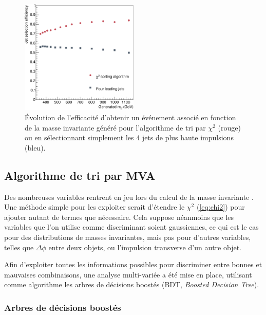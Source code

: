 \begin{figure}[tbp] \centering
    \includegraphics[width=0.50\textwidth]{chapitre6/figs/chi2/jet_selection_efficiency.pdf}
    \caption{Évolution de l'efficacité d'obtenir un événement associé en fonction de la masse invariante \ttbar généré pour l'algorithme de tri par $\chi^2$ (\textcolor{rouge_grandmere}{rouge}) ou en sélectionnant simplement les 4 jets de plus haute impulsions (\textcolor{bleu_gris}{bleu}).}
    \label{fig:chi2_vs_jets}
\end{figure}

\subsection{Algorithme de tri par MVA}

Des nombreuses variables rentrent en jeu lors du calcul de la masse invariante \ttbar. Une méthode simple pour les exploiter serait d'étendre le $\chi^2$ (\cref{eq:chi2}) pour ajouter autant de termes que nécessaire. Cela suppose néanmoins que les variables que l'on utilise comme discriminant soient gaussiennes, ce qui est le cas pour des distributions de masses invariantes, mais pas pour d'autres variables, telles que $\Delta \phi$ entre deux objets, ou l'impulsion transverse d'un autre objet.

Afin d'exploiter toutes les informations possibles pour discriminer entre bonnes et mauvaises combinaisons, une analyse multi-variée a été mise en place, utilisant comme algorithme les arbres de décisions boostés (BDT, \emph{Boosted Decision Tree}).


\subsubsection{Arbres de décisions boostés}


